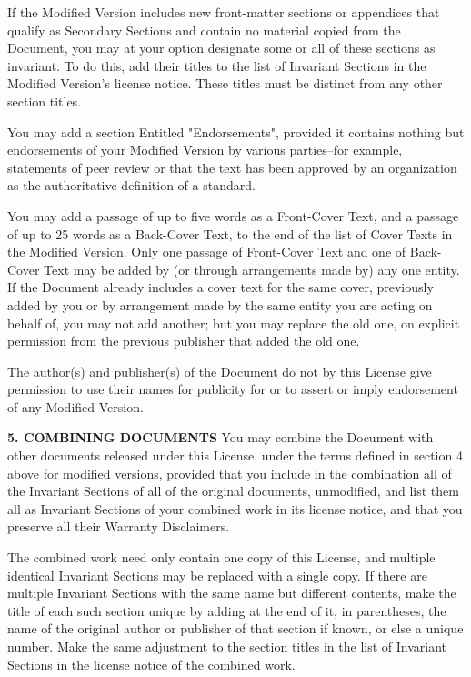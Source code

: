 If the Modified Version includes new front-matter sections or appendices that qualify as Secondary Sections and contain no material copied from the Document, you may at your option designate some or all of these sections as invariant. To do this, add their titles to the list of Invariant Sections in the Modified Version's license notice. These titles must be distinct from any other section titles.

You may add a section Entitled "Endorsements", provided it contains nothing but endorsements of your Modified Version by various parties--for example, statements of peer review or that the text has been approved by an organization as the authoritative definition of a standard.

You may add a passage of up to five words as a Front-Cover Text, and a passage of up to 25 words as a Back-Cover Text, to the end of the list of Cover Texts in the Modified Version. Only one passage of Front-Cover Text and one of Back-Cover Text may be added by (or through arrangements made by) any one entity. If the Document already includes a cover text for the same cover, previously added by you or by arrangement made by the same entity you are acting on behalf of, you may not add another; but you may replace the old one, on explicit permission from the previous publisher that added the old one.

The author(s) and publisher(s) of the Document do not by this License give permission to use their names for publicity for or to assert or imply endorsement of any Modified Version.

\textbf{5. COMBINING DOCUMENTS}
You may combine the Document with other documents released under this License, under the terms defined in section 4 above for modified versions, provided that you include in the combination all of the Invariant Sections of all of the original documents, unmodified, and list them all as Invariant Sections of your combined work in its license notice, and that you preserve all their Warranty Disclaimers.

The combined work need only contain one copy of this License, and multiple identical Invariant Sections may be replaced with a single copy. If there are multiple Invariant Sections with the same name but different contents, make the title of each such section unique by adding at the end of it, in parentheses, the name of the original author or publisher of that section if known, or else a unique number. Make the same adjustment to the section titles in the list of Invariant Sections in the license notice of the combined work.


